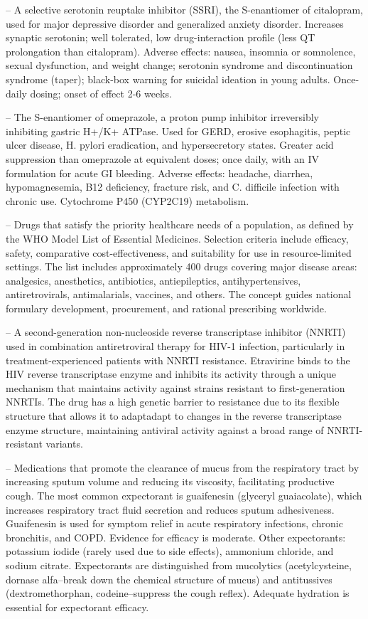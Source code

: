 -- A selective serotonin reuptake inhibitor (SSRI), the S-enantiomer of citalopram, used for major depressive disorder and generalized anxiety disorder. Increases synaptic serotonin; well tolerated, low drug-interaction profile (less QT prolongation than citalopram). Adverse effects: nausea, insomnia or somnolence, sexual dysfunction, and weight change; serotonin syndrome and discontinuation syndrome (taper); black-box warning for suicidal ideation in young adults. Once-daily dosing; onset of effect 2-6 weeks.

-- The S-enantiomer of omeprazole, a proton pump inhibitor irreversibly inhibiting gastric H+/K+ ATPase. Used for GERD, erosive esophagitis, peptic ulcer disease, H. pylori eradication, and hypersecretory states. Greater acid suppression than omeprazole at equivalent doses; once daily, with an IV formulation for acute GI bleeding. Adverse effects: headache, diarrhea, hypomagnesemia, B12 deficiency, fracture risk, and C. difficile infection with chronic use. Cytochrome P450 (CYP2C19) metabolism.

-- Drugs that satisfy the priority healthcare needs of a population, as defined by the WHO Model List of Essential Medicines. Selection criteria include efficacy, safety, comparative cost-effectiveness, and suitability for use in resource-limited settings. The list includes approximately 400 drugs covering major disease areas: analgesics, anesthetics, antibiotics, antiepileptics, antihypertensives, antiretrovirals, antimalarials, vaccines, and others. The concept guides national formulary development, procurement, and rational prescribing worldwide.

-- A second-generation non-nucleoside reverse transcriptase inhibitor (NNRTI) used in combination antiretroviral therapy for HIV-1 infection, particularly in treatment-experienced patients with NNRTI resistance. Etravirine binds to the HIV reverse transcriptase enzyme and inhibits its activity through a unique mechanism that maintains activity against strains resistant to first-generation NNRTIs. The drug has a high genetic barrier to resistance due to its flexible structure that allows it to adaptadapt to changes in the reverse transcriptase enzyme structure, maintaining antiviral activity against a broad range of NNRTI-resistant variants.

-- Medications that promote the clearance of mucus from the respiratory tract by increasing sputum volume and reducing its viscosity, facilitating productive cough. The most common expectorant is guaifenesin (glyceryl guaiacolate), which increases respiratory tract fluid secretion and reduces sputum adhesiveness. Guaifenesin is used for symptom relief in acute respiratory infections, chronic bronchitis, and COPD. Evidence for efficacy is moderate. Other expectorants: potassium iodide (rarely used due to side effects), ammonium chloride, and sodium citrate. Expectorants are distinguished from mucolytics (acetylcysteine, dornase alfa--break down the chemical structure of mucus) and antitussives (dextromethorphan, codeine--suppress the cough reflex). Adequate hydration is essential for expectorant efficacy.

